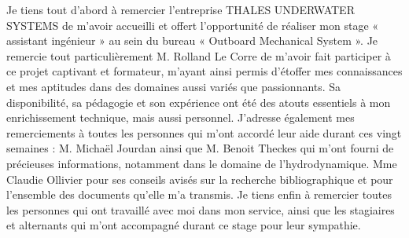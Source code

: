 Je tiens tout d’abord à remercier l’entreprise THALES UNDERWATER SYSTEMS de m’avoir accueilli et offert l’opportunité de réaliser mon stage « assistant ingénieur » au sein du bureau « Outboard Mechanical System ».
Je remercie tout particulièrement M. Rolland Le Corre de m’avoir fait participer à ce projet captivant et formateur, m’ayant ainsi permis d’étoffer mes connaissances et mes aptitudes dans des domaines aussi variés que passionnants. Sa disponibilité, sa pédagogie et son expérience ont été des atouts essentiels à mon enrichissement technique, mais aussi personnel.
J’adresse également mes remerciements à toutes les personnes qui m’ont accordé leur aide durant ces vingt semaines :
M. Michaël Jourdan ainsi que M. Benoit Theckes qui m’ont fourni de précieuses informations, notamment dans le domaine de l’hydrodynamique.
Mme Claudie Ollivier pour ses conseils avisés sur la recherche bibliographique et pour l’ensemble des documents qu’elle m’a transmis.
Je tiens enfin à remercier toutes les personnes qui ont travaillé avec moi dans mon service, ainsi que les stagiaires et alternants qui m’ont accompagné durant ce stage pour leur sympathie.